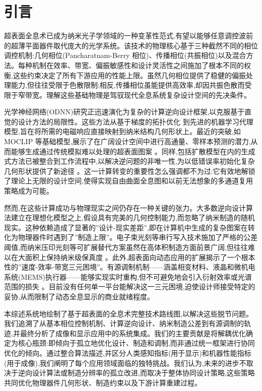 \section{引言}\label{ux5f15ux8a00}

超表面全息术已成为纳米光子学领域的一种变革性范式,有望以能够任意调控波前的超薄平面器件取代庞大的光学系统。该技术的物理核心基于三种截然不同的相位调控机制:几何相位(Pancharatnam-Berry 相位)、传播相位(共振相位)以及混合方法。每种机制在效率、带宽、偏振敏感性和设计灵活性之间施加了根本不同的权衡,这些约束决定了所有下游应用的性能上限。虽然几何相位提供了稳健的偏振处理能力,但往往受限于色散限制;相反,传播相位虽能提供高效率,却因共振色散而受限于窄带宽。理解这些基础物理是驾驭现代全息系统复杂设计空间的先决条件。

光学神经网络(ODNN)研究正迅速演化为复杂的计算逆向设计框架,以克服基于直觉的设计方法的局限性。这些方法从基于梯度的拓扑优化 \citep{doi_10_2528_pier12020501_bb5007b1} 到先进的机器学习代理模型,旨在将所需的电磁响应直接映射到纳米结构几何形状上。最近的突破,如 MOCLIP 等基础模型,展示了在广阔设计空间中进行高通量、零样本预测的潜力,从而能够生成通过传统模拟难以处理的超表面图案 \citep{doi_10_1038_s41467_026_76714_x_8ca5d39b}。同样,包括扩散模型在内的生成式方法已被整合到工作流程中,以解决逆问题的非唯一性,为以低错误率初始化复杂几何形状提供了新途径 \citep{doi_10_48550_arxiv_2506_21748_dc49c062}。这一计算转变的重要性怎么强调都不为过:它有效地解锁了理论上无限的设计空间,使得实现自由曲面全息图和以前无法想象的多通道复用策略成为可能。

然而,在这些计算成功与物理现实之间仍存在一种关键的张力。大多数逆向设计算法建立在理想化模型之上,假设具有完美的几何控制能力,而忽略了纳米制造的随机现实。这种依赖造成了显著的''设计-现实差距'',即在计算机中生成的复杂图案在转化为物理器件时遇到了''制造上限''。电子束光刻等串行写入技术施加了严格的公差阈值,而纳米压印光刻等可扩展替代方案虽然在高体积制造方面前景广阔,但往往难以在大面积上保持纳米级保真度 \citep{doi_10_3390_encyclopedia5040197_fe6bfdc9}。此外,超表面向动态应用的扩展揭示了一个根本性的''速度-效率-带宽三元困境''。有源调制机制------涵盖相变材料、液晶和微机电系统(MEMS)执行器------能够实现实时重构,但不可避免地会引入衍射效率或光谱范围的损失 \citep{doi_10_1002_lpor_71186_5fa1be75}。目前没有任何单一平台能解决这一三元困境,迫使设计师接受特定的妥协,从而限制了动态全息显示的商业就绪程度。

本综述系统地绘制了基于超表面的全息术完整技术路线图,以解决这些脱节问题。我们追溯了从基本相位控制机制、计算逆向设计、纳米制造公差到有源调制的轨迹,并最终分析了成像和显示应用中的系统集成。我们的主要贡献是将解耦优化确定为核心瓶颈:即倾向于孤立地优化设计、制造和调制,而非通过统一框架进行协同优化的倾向。通过整合算法描述,并区分人类感知指标(用于显示)和机器性能指标(用于成像),我们阐明了每个应用领域面临的独特挑战。我们认为,未来的进步不取决于逆向设计算法或制造分辨率的孤立改进,而取决于整体协同设计策略,这些策略共同优化物理器件几何形状、制造约束以及下游计算重建过程。


